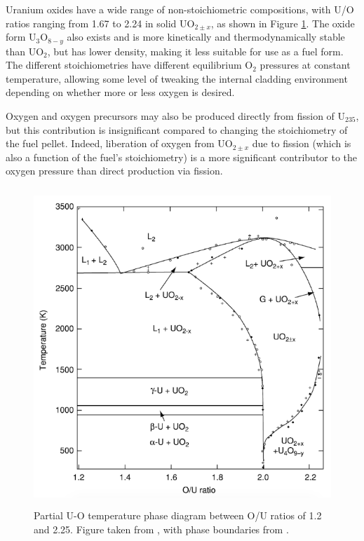 Uranium oxides have a wide range of non-stoichiometric compositions, with U/O ratios ranging from 1.67 to 2.24 in solid UO$_{2 \pm x}$, as shown in Figure \ref{figure:U_O_phase_diagram}. The oxide form U$_{3}$O$_{8-y}$ also exists and is more kinetically and thermodynamically stable than UO$_{2}$, but has lower density, making it less suitable for use as a fuel form. The different stoichiometries have different equilibrium O$_{2}$ pressures at constant temperature, allowing some level of tweaking the internal cladding environment depending on whether more or less oxygen is desired. 

Oxygen and oxygen precursors may also be produced directly from fission of U$_{235}$, but this contribution is insignificant compared to changing the stoichiometry of the fuel pellet. Indeed, liberation of oxygen from UO$_{2 \pm x}$ due to fission (which is also a function of the fuel's stoichiometry) is a more significant contributor to the oxygen pressure than direct production via fission.

\begin{figure}[ht]
\centering
\includegraphics[height=12cm]{images/UO_phase_diagram.png}
\caption[Partial U-O temperature phase diagram between O/U ratios of 1.2 and 2.25.]{Partial U-O temperature phase diagram between O/U ratios of 1.2 and 2.25. Figure taken from \cite{katz2007chemistry}, with phase boundaries from \cite{rand1978thermodynamic, chevalier2002progress, gueneau2002thermodynamic}.}
\label{figure:U_O_phase_diagram}
\end{figure}


